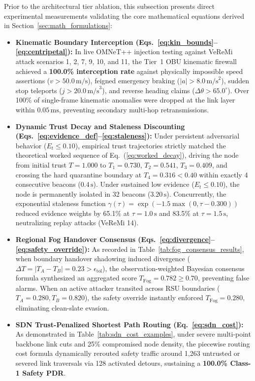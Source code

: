 \documentclass[conference]{IEEEtran}
\begin{document}
Prior to the architectural tier ablation, this subsection presents direct experimental measurements validating the core mathematical equations derived in Section~\ref{sec:math_formulations}:
\begin{itemize}
    \item \textbf{Kinematic Boundary Interception (Eqs.~\ref{eq:kin_bounds}--\ref{eq:centripetal}):} In live OMNeT++ injection testing against VeReMi attack scenarios 1, 2, 7, 9, 10, and 11, the Tier~1 OBU kinematic firewall achieved a \textbf{100.0\% interception rate} against physically impossible speed assertions ($v > 50.0\,\text{m/s}$), feigned emergency braking ($|a| > 8.0\,\text{m/s}^2$), sudden stop teleports ($j > 20.0\,\text{m/s}^3$), and reverse heading claims ($\Delta\theta > 65.0^\circ$). Over 100\% of single-frame kinematic anomalies were dropped at the link layer within $0.05\,\text{ms}$, preventing secondary multi-hop retransmissions.
    \item \textbf{Dynamic Trust Decay and Staleness Discounting (Eqs.~\ref{eq:evidence_def}--\ref{eq:staleness}):} Under persistent adversarial behavior ($E_t \le 0.10$), empirical trust trajectories strictly matched the theoretical worked sequence of Eq.~(\ref{eq:worked_decay}), driving the node from initial trust $T=1.000$ to $T_1 = 0.730$, $T_2 = 0.541$, $T_3 = 0.409$, and crossing the hard quarantine boundary at $T_4 = 0.316 < 0.40$ within exactly 4 consecutive beacons ($0.4\,\text{s}$). Under sustained low evidence ($E_t \le 0.10$), the node is permanently isolated in 32 beacons ($3.20\,\text{s}$). Concurrently, the exponential staleness function $\gamma(\tau) = \exp(-1.5\max(0, \tau - 0.300))$ reduced evidence weights by 65.1\% at $\tau = 1.0\,\text{s}$ and 83.5\% at $\tau = 1.5\,\text{s}$, neutralizing replay attacks (VeReMi 14).
    \item \textbf{Regional Fog Handover Consensus (Eqs.~\ref{eq:divergence}--\ref{eq:safety_override}):} As recorded in Table~\ref{tab:fog_consensus_results}, when boundary handover shadowing induced divergence ($\Delta T = |T_A - T_B| = 0.23 > \epsilon_{\text{tol}}$), the observation-weighted Bayesian consensus formula synthesized an aggregated score $T_{\text{Fog}} = 0.782 \ge 0.70$, preventing false alarms. When an active attacker transited across RSU boundaries ($T_A = 0.280, T_B = 0.820$), the safety override instantly enforced $T_{\text{Fog}} = 0.280$, eliminating clean-slate evasion.
    \item \textbf{SDN Trust-Penalized Shortest Path Routing (Eq.~\ref{eq:sdn_cost}):} As demonstrated in Table~\ref{tab:sdn_cost_examples}, under severe multi-point backbone link cuts and 25\% compromised node density, the piecewise routing cost formula dynamically rerouted safety traffic around 1,263 untrusted or severed link traversals via 128 activated detours, sustaining a \textbf{100.0\% Class-1 Safety PDR}.
\end{itemize}
\end{document}
